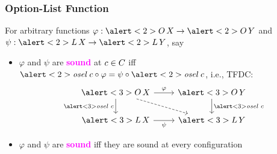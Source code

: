 \documentclass[draft,notes=show,xcolor=dvipsnames]{beamer}
\newcommand*{\vocab}[1]{\textbf{\textcolor{magenta}{#1}}}
\begin{document}
\begin{frame}[fragile]
  \frametitle{Option-List Function}
  \begin{definition}[Soundness]
    For arbitrary functions $\varphi : \alert<2>{\OLst[]}\Val \to \alert<2>{\OLst[]}\ValY$ and $\psi : \alert<2>{\Lst[]}\Val \to \alert<2>{\Lst[]}\ValY$, say
    \begin{itemize}
      \item $\varphi$ and $\psi$ are \vocab{sound} at $c \in C$ iff $\alert<2>{\osel}\ \cE \comp \varphi = \psi \comp \alert<2>{\osel}\ \cE$, i.e., TFDC:
      $$
        \begin{tikzcd}
          \alert<3>{\OLst[]}\Val \ar[d, "\alert<3>{\osel}\ \cE"'] \ar[r, "\varphi"] \ar[dr, dashed] &
          \alert<3>{\OLst[]}\ValY \ar[d, "\alert<3>{\osel}\ \cE"] \\
          \alert<3>{\Lst[]}\Val \ar[r, "\psi"'] & \alert<3>{\Lst[]}\ValY
        \end{tikzcd}
      $$
      \item $\varphi$ and $\psi$ are \vocab{sound} iff they are sound at every configuration
    \end{itemize}
  \end{definition}
\end{frame}
\end{document}
